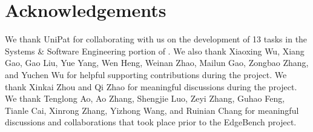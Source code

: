 \section{Acknowledgements}
\label{sec:acknowledgements}

We thank UniPat for collaborating with us on the development of 13 tasks in the Systems \& Software Engineering portion of \benchmark{}.
We also thank Xiaoxing Wu, Xiang Gao, Gao Liu, Yue Yang, Wen Heng, Weinan Zhao, Mailun Gao, Zongbao Zhang, and Yuchen Wu for helpful supporting contributions during the project.
We thank Xinkai Zhou and Qi Zhao for meaningful discussions during the project.
We thank Tenglong Ao, Ao Zhang, Shengjie Luo, Zeyi Zhang, Guhao Feng, Tianle Cai, Xinrong Zhang, Yizhong Wang, and Ruinian Chang for meaningful discussions and collaborations that took place prior to the EdgeBench project.
